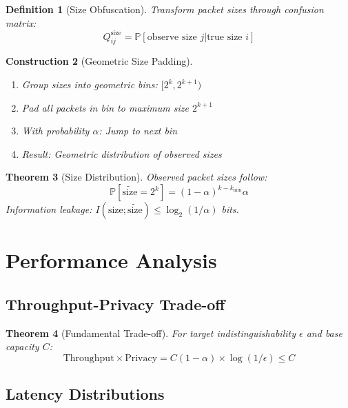 \documentclass[11pt,final]{article}
\newcommand{\latent}[1]{#1}
\newcommand{\observed}[1]{\tilde{#1}}
\newtheorem{theorem}{Theorem}[section]
\newtheorem{definition}[theorem]{Definition}
\newtheorem{construction}[theorem]{Construction}
\begin{document}
\begin{definition}[Size Obfuscation]
Transform packet sizes through confusion matrix:
\begin{equation}
Q^{\text{size}}_{ij} = \mathbb{P}[\text{observe size } j | \text{true size } i]
\end{equation}
\end{definition}

\begin{construction}[Geometric Size Padding]
\begin{enumerate}
    \item Group sizes into geometric bins: $[2^k, 2^{k+1})$
    \item Pad all packets in bin to maximum size $2^{k+1}$
    \item With probability $\alpha$: Jump to next bin
    \item Result: Geometric distribution of observed sizes
\end{enumerate}
\end{construction}

\begin{theorem}[Size Distribution]
Observed packet sizes follow:
\begin{equation}
\mathbb{P}[\observed{\text{size}} = 2^k] = (1-\alpha)^{k-k_{\min}} \alpha
\end{equation}
Information leakage: $I(\latent{\text{size}}; \observed{\text{size}}) \leq \log_2(1/\alpha)$ bits.
\end{theorem}

\section{Performance Analysis}

\subsection{Throughput-Privacy Trade-off}

\begin{theorem}[Fundamental Trade-off]
For target indistinguishability $\epsilon$ and base capacity $C$:
\begin{equation}
\text{Throughput} \times \text{Privacy} = C(1-\alpha) \times \log(1/\epsilon) \leq C
\end{equation}
\end{theorem}

\subsection{Latency Distributions}
\end{document}
